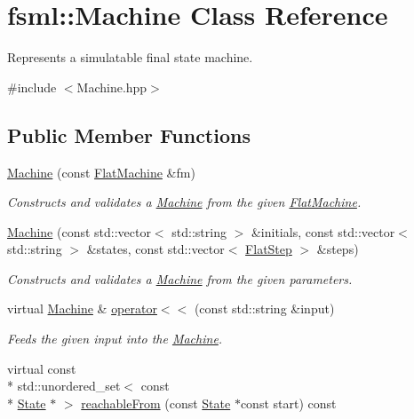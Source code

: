 \hypertarget{classfsml_1_1Machine}{\section{fsml\-:\-:Machine Class Reference}
\label{classfsml_1_1Machine}
}


Represents a simulatable final state machine.  




{\ttfamily \#include $<$Machine.\-hpp$>$}

\subsection*{Public Member Functions}
\begin{DoxyCompactItemize}
\item 
\hyperlink{classfsml_1_1Machine_a0666d3b6834e968bd0fe1461164de7ef}{Machine} (const \hyperlink{structfsml_1_1FlatMachine}{Flat\-Machine} \&fm)
\begin{DoxyCompactList}\small\item\em Constructs and validates a \hyperlink{classfsml_1_1Machine}{Machine} from the given \hyperlink{structfsml_1_1FlatMachine}{Flat\-Machine}. \end{DoxyCompactList}\item 
\hyperlink{classfsml_1_1Machine_a0c60fab103e0e65343c729ed3502ebac}{Machine} (const std\-::vector$<$ std\-::string $>$ \&initials, const std\-::vector$<$ std\-::string $>$ \&states, const std\-::vector$<$ \hyperlink{structfsml_1_1FlatStep}{Flat\-Step} $>$ \&steps)
\begin{DoxyCompactList}\small\item\em Constructs and validates a \hyperlink{classfsml_1_1Machine}{Machine} from the given parameters. \end{DoxyCompactList}\item 
virtual \hyperlink{classfsml_1_1Machine}{Machine} \& \hyperlink{classfsml_1_1Machine_a4c02303acf2c3bd89ffc6ceda604b02d}{operator$<$$<$} (const std\-::string \&input)
\begin{DoxyCompactList}\small\item\em Feeds the given input into the \hyperlink{classfsml_1_1Machine}{Machine}. \end{DoxyCompactList}\item 
virtual const \\*
std\-::unordered\-\_\-set$<$ const \\*
\hyperlink{classfsml_1_1State}{State} $\ast$ $>$ \hyperlink{classfsml_1_1Machine_a7d184c839fe996141a692152b9b37e0a}{reachable\-From} (const \hyperlink{classfsml_1_1State}{State} $\ast$const start) const 

\end{DoxyCompactItemize}

